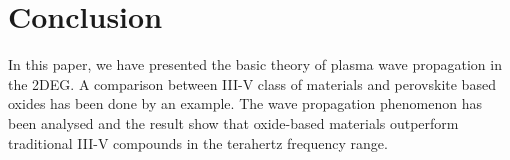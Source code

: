 \documentclass[conference, 10pt]{IEEEtran}
\renewcommand{\^}{\hat}  %
\begin{document}
\section{Conclusion}
%
In this paper, we have presented the basic theory of plasma wave propagation in the 2DEG. A comparison between III-V class of materials and perovskite based oxides has been done by an example. The wave propagation phenomenon has been analysed and the result show that oxide-based materials outperform traditional III-V compounds in the terahertz frequency range.
%


\end{document}
